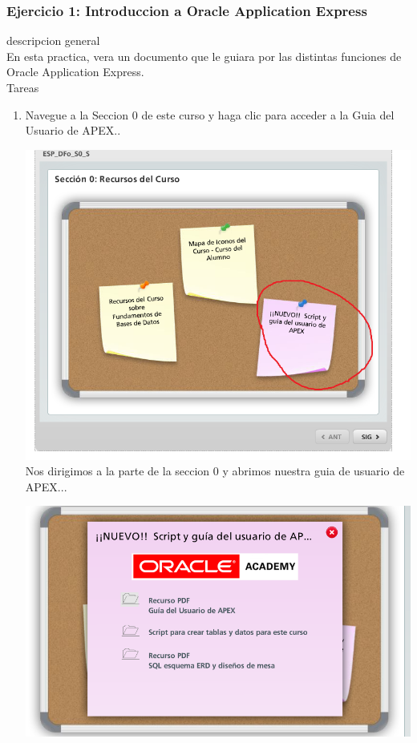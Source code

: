 \documentclass[12pt,letterpaper]{article}
\begin{document}
\subsubsection{Ejercicio 1: Introduccion a Oracle Application Express} 
descripcion general  \\
En esta practica, vera un documento que le guiara por las distintas funciones de Oracle Application Express. \\

Tareas\\

\begin{enumerate}[1.]
    \item  Navegue a la Seccion 0 de este curso y haga clic para acceder a la Guia del Usuario de APEX.. 
     
     
     
       \includegraphics[width=14cm]{./carolinaImagen/imagen1.png}
	                 Nos dirigimos a la parte de la seccion 0 y abrimos nuestra guia de usuario de APEX...
	
  \newpage
  

  \includegraphics[width=14cm]{./carolinaImagen/1.png} 
      

\end{enumerate}
\end{document}
